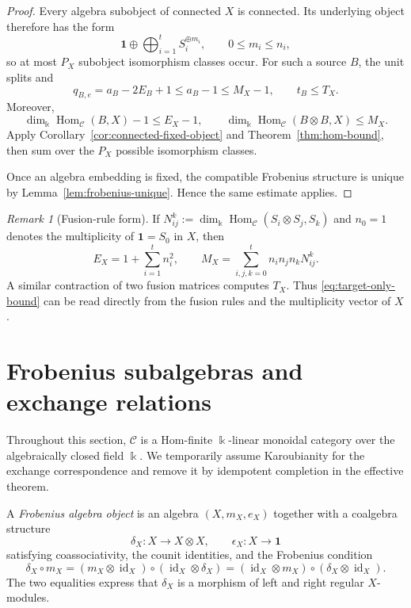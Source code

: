 \documentclass[11pt]{amsart}
\theoremstyle{definition}
\theoremstyle{remark}
\newtheorem{remark}[theorem]{Remark}
\newcommand{\C}{\mathcal C}
\newcommand{\one}{\mathbf 1}
\newcommand{\kk}{\Bbbk}
\DeclareMathOperator{\Hom}{Hom}
\DeclareMathOperator{\id}{id}
\begin{document}
\begin{proof}
Every algebra subobject of connected $X$ is connected.  Its underlying
object therefore has the form
\[
 \one\oplus\bigoplus_{i=1}^t S_i^{\oplus m_i},
 \qquad 0\leq m_i\leq n_i,
\]
so at most $P_X$ subobject isomorphism classes occur.  For such a source
$B$, the unit splits
and
\[
 q_{B,e}=a_B-2E_B+1\leq a_B-1\leq M_X-1,
 \qquad
 t_B\leq T_X.
\]
Moreover,
\[
 \dim_{\kk}\Hom_{\C}(B,X)-1\leq E_X-1,
 \qquad
 \dim_{\kk}\Hom_{\C}(B\otimes B,X)\leq M_X.
\]
Apply Corollary~\ref{cor:connected-fixed-object} and
Theorem~\ref{thm:hom-bound}, then sum over the $P_X$ possible isomorphism
classes.

Once an algebra embedding is fixed, the compatible Frobenius structure is
unique by Lemma~\ref{lem:frobenius-unique}.  Hence the same estimate applies.
\end{proof}

\begin{remark}[Fusion-rule form]
If $N_{ij}^{k}:=\dim_{\kk}\Hom_{\C}(S_i\otimes S_j,S_k)$ and $n_0=1$ denotes the
multiplicity of $\one=S_0$ in $X$, then
\[
 E_X=1+\sum_{i=1}^t n_i^2,
 \qquad
 M_X=\sum_{i,j,k=0}^t n_i n_j n_k N_{ij}^{k}.
\]
A similar contraction of two fusion matrices computes $T_X$.  Thus
\eqref{eq:target-only-bound} can be read directly from the fusion rules and
the multiplicity vector of $X$.
\end{remark}
\section{Frobenius subalgebras and exchange relations}\label{sec:frobenius}

Throughout this section, $\C$ is a Hom-finite $\kk$-linear monoidal
category over the algebraically closed field $\kk$.  We temporarily
assume Karoubianity for the exchange correspondence and remove it by
idempotent completion in the effective theorem.


A \emph{Frobenius algebra object} is an algebra
$(X,m_X,e_X)$ together with a coalgebra structure
\[
  \delta_X:X\longrightarrow X\otimes X,
  \qquad
  \epsilon_X:X\longrightarrow\one
\]
satisfying coassociativity, the counit identities, and the Frobenius
condition
\begin{equation}\label{eq:frobenius-equations}
  \delta_X\circ m_X
  =(m_X\otimes\id_X)\circ(\id_X\otimes\delta_X)
  =(\id_X\otimes m_X)\circ(\delta_X\otimes\id_X).
\end{equation}
The two equalities express that $\delta_X$ is a morphism of left and right
regular $X$-modules.
\end{document}

